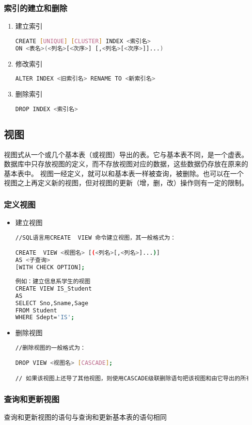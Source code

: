 \subsubsection{索引的建立和删除}
\begin{enumerate}
\item 建立索引
\begin{lstlisting}[language=bash]
CREATE [UNIQUE] [CLUSTER] INDEX <索引名>
ON <表名>(<列名>[<次序>] [,<列名>[<次序>]]...)
\end{lstlisting}
\item 修改索引
\begin{lstlisting}[language=bash]
ALTER INDEX <旧索引名> RENAME TO <新索引名>
\end{lstlisting}
\item  删除索引
\begin{lstlisting}[language=bash]
DROP INDEX <索引名>
\end{lstlisting}
\end{enumerate}

\subsection{视图}
视图式从一个或几个基本表（或视图）导出的表。它与基本表不同，是一个虚表。数据库中只存放视图的定义，而不存放视图对应的数据，这些数据仍存放在原来的基本表中。
视图一经定义，就可以和基本表一样被查询，被删除。也可以在一个视图之上再定义新的视图，但对视图的更新（增，删，改）操作则有一定的限制。
\subsubsection{定义视图}
\begin{itemize}
\item 建立视图
\begin{lstlisting}[language=bash]
//SQL语言用CREATE  VIEW 命令建立视图，其一般格式为：

CREATE  VIEW <视图名> [(<列名>[,<列名>]...)]
AS <子查询>
[WITH CHECK OPTION];
\end{lstlisting}

\begin{lstlisting}[language=bash]
例如：建立信息系学生的视图
CREATE VIEW IS_Student
AS
SELECT Sno,Sname,Sage
FROM Student
WHERE Sdept='IS';
\end{lstlisting}


\item 删除视图
\begin{lstlisting}[language=bash]
//删除视图的一般格式为：

DROP VIEW <视图名> [CASCADE]; 

// 如果该视图上还导了其他视图，则使用CASCADE级联删除语句把该视图和由它导出的所有视图一起删除


\end{lstlisting}


\end{itemize}
\subsubsection{查询和更新视图}
查询和更新视图的语句与查询和更新基本表的语句相同


